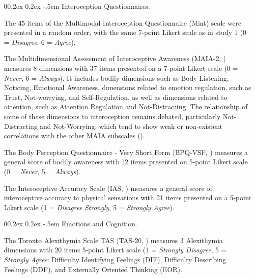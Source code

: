 \documentclass[
  jou,
  floatsintext,
  longtable,
  nolmodern,
  notxfonts,
  notimes,
  colorlinks=true,linkcolor=blue,citecolor=blue,urlcolor=blue]{apa7}
\makeatletter
\renewcommand{\paragraph}{\@startsection{paragraph}{4}{\parindent}%
	{0\baselineskip \@plus 0.2ex \@minus 0.2ex}%
	{-.5em}%
	{\normalfont\normalsize\bfseries\typesectitle}}
\makeatother
\begin{document}
\paragraph{Interoception
Questionnaires.}\label{interoception-questionnaires}

The 45 items of the Multimodal Interoception Questionnaire (Mint) scale
were presented in a random order, with the same 7-point Likert scale as
in study 1 (0 = \emph{Disagree}, 6 = \emph{Agree}).

The Multidimensional Assessment of Interoceptive Awareness (MAIA-2,
)
measures 8 dimensions with 37 items presented on a 7-point Likert scale
(0 = \emph{Never}, 6 = \emph{Always}). It includes bodily dimensions
such as Body Listening, Noticing, Emotional Awareness, dimensions
related to emotion regulation, such as Trust, Not-worrying, and
Self-Regulation, as well as dimensions related to attention, such as
Attention Regulation and Not-Distracting. The relationship of some of
these dimensions to interoception remains debated, particularly
Not-Distracting and Not-Worrying, which tend to show weak or
non-existent correlations with the other MAIA subscales
().

The Body Perception Questionnaire - Very Short Form (BPQ-VSF,
) measures a
general score of bodily awareness with 12 items presented on 5-point
Likert scale (0 = \emph{Never}, 5 = \emph{Always}).

The Interoceptive Accuracy Scale (IAS,
) measures a
general score of interoceptive accuracy to physical sensations with 21
items presented on a 5-point Likert scale (1 = \emph{Disagree Strongly},
5 = \emph{Strongly Agree}).

\paragraph{Emotions and Cognition.}\label{emotions-and-cognition}

The Toronto Alexithymia Scale TAS (TAS-20,
) measures 3
Alexithymia dimensions with 20 items 5-point Likert scale (1 =
\emph{Strongly Disagree}, 5 = \emph{Strongly Agree}: Difficulty
Identifying Feelings (DIF), Difficulty Describing Feelings (DDF), and
Externally Oriented Thinking (EOR).
\end{document}

